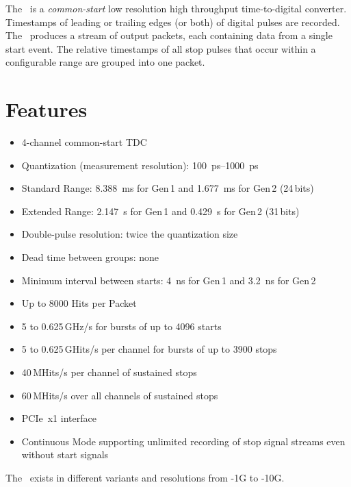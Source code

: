 The \deviceName\ is a \emph{common-start} low resolution high throughput
time-to-digital converter.  Timestamps of leading or trailing edges (or both)
of digital pulses are recorded.  The \deviceName\ produces a stream of output
packets, each containing data from a single start event.  The relative
timestamps of all stop pulses that occur within a configurable range are
grouped into one packet.

\section{Features} \label{sec:features}
\begin{itemize}
    \item 4-channel common-start TDC
    \item Quantization (measurement resolution):
        \SIrange{100}{1000}{\pico\second}
    \item Standard Range: \SI{8.388}{\milli\second} for Gen\,1 and
        \SI{1.677}{\milli\second} for Gen\,2 (24\,bits)
    \item Extended Range: \SI{2.147}{\second} for Gen\,1 and
        \SI{0.429}{\second} for Gen\,2 (31\,bits)
    \item Double-pulse resolution: twice the quantization size
    \item Dead time between groups: none
    \item Minimum interval between starts: \SI{4}{\nano\second} for Gen\,1
        and \SI{3.2}{\nano\second} for Gen\,2
    \item Up to 8000 Hits per Packet
    \item 5 to 0.625\,GHz/s for bursts of up to 4096 starts
    \item 5 to 0.625\,GHits/s per channel for bursts of up to 3900 stops
    \item 40\,MHits/s per channel of sustained stops
    \item 60\,MHits/s over all channels of sustained stops
    \item PCIe~x1 interface
    \item Continuous Mode supporting unlimited recording of stop signal streams even without start signals
\end{itemize} 

The \deviceName\ exists in different variants and resolutions from
\deviceName-1G to \deviceName-10G.  


